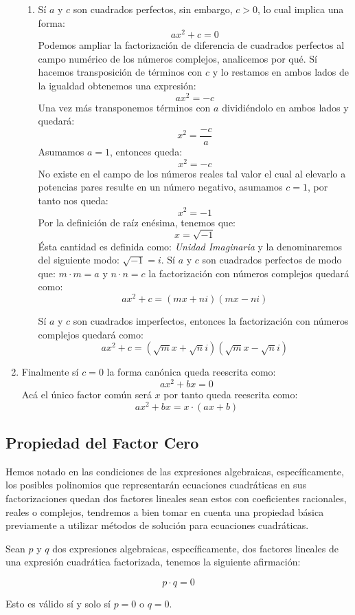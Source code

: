 \documentclass[A4paper, 10pt, oneside]{book}
\begin{document}
\begin{enumerate}
\begin{enumerate}
			\item Sí $a$ y $c$ son cuadrados perfectos, sin embargo, $c>0$, lo cual implica una forma: $$ax^2+c=0$$ Podemos ampliar la factorización de diferencia de cuadrados perfectos al campo numérico de los números complejos, analicemos por qué. Sí hacemos transposición de términos con $c$ y lo restamos en ambos lados de la igualdad obtenemos una expresión: $$ax^2=-c$$ Una vez más transponemos términos con $a$ dividiéndolo en ambos lados y quedará: $$x^2=\frac{-c}{a}$$ Asumamos $a = 1$, entonces queda: $$x^2=-c$$ No existe en el campo de los números reales tal valor el cual al elevarlo a potencias pares resulte en un número negativo, asumamos $c=1$, por tanto nos queda: $$x^2=-1$$ Por la definición de raíz enésima, tenemos que: $$x=\sqrt{-1}$$ Ésta cantidad es definida como: \textit{Unidad Imaginaria} y la denominaremos del siguiente modo: $\sqrt{-1}=i$. Sí $a$ y $c$ son cuadrados perfectos de modo que: $m\cdot{m}=a$ y $n\cdot{n}=c$ la factorización con números complejos quedará como: $$ax^2+c=(mx+ni)(mx-ni)$$
			
			Sí $a$ y $c$ son cuadrados imperfectos, entonces la factorización con números complejos quedará como: $$ax^2+c=\left(\sqrt{m}x+\sqrt{n}i\right)\left(\sqrt{m}x-\sqrt{n}i\right)$$
		\end{enumerate}
		\item Finalmente sí $c=0$ la forma canónica queda reescrita como: $$ax^2+bx=0$$ Acá el único factor común será $x$ por tanto queda reescrita como: $$ax^2+bx=x\cdot(ax+b)$$
	\end{enumerate}
	
	\subsection{Propiedad del Factor Cero}
	Hemos notado en las condiciones de las expresiones algebraicas, específicamente, los posibles polinomios que representarán ecuaciones cuadráticas en sus factorizaciones quedan dos factores lineales sean estos con coeficientes racionales, reales o complejos, tendremos a bien tomar en cuenta una propiedad básica previamente a utilizar métodos de solución para ecuaciones cuadráticas.
	
	\begin{tcolorbox}[title=Propiedad del Factor Cero]
		Sean $p$ y $q$ dos expresiones algebraicas, específicamente, dos factores lineales de una expresión cuadrática factorizada, tenemos la siguiente afirmación: 
		
		$$p\cdot q = 0$$
		
		Esto es válido sí y solo sí $p=0$ o $q=0$.
	\end{tcolorbox}
	
\end{document}
